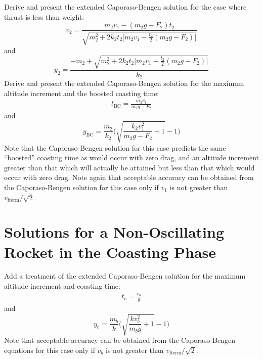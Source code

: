 Derive and present the extended Caporaso-Bengen solution for the case where thrust is less than weight:
\begin{equation*}
v_2 = \frac{m_2v_1 - (m_2g - F_2)t_2}{\sqrt{m_2^{2} + 2k_2t_2\bigl[m_2v_1 - \tfrac{t_2}{2}(m_2g - F_2)\bigr]}}
\end{equation*}
and
\begin{equation*}
y_2 = \frac{-m_2 + \sqrt{m_2^{2} + 2k_2t_2\bigl[m_2v_1 - \tfrac{t_2}{2}(m_2g - F_2)\bigr]}}{k_2}
\end{equation*}
Derive and present the extended Caporaso-Bengen solution for the maximum altitude increment and the boosted
coasting time:
\begin{gather*}
t_{\mathrm{BC}} = \frac{m_2v_1}{m_2g - F_2}
\end{gather*}
and
\begin{equation*}
y_{\mathrm{BC}} = \frac{m_2}{k_2}\biggl(\sqrt{\frac{k_2v_1^{2}}{m_2g - F_2} + 1} - 1\biggr)
\end{equation*}
Note that the Caporaso-Bengen solution for this case predicts the same ``boosted'' coasting time as would
occur with zero drag, and an altitude increment greater than that which will actually be attained but less
than that which would occur with zero drag. Note again that acceptable accuracy can be obtained from the
Caporaso-Bengen solution for this case only if $v_1$ is not greater than $v_{\mathrm{fterm}}/\sqrt{2}$.

\section*{Solutions for a Non-Oscillating Rocket in the Coasting Phase}\label{supp:ch4-summary:coasting}

Add a treatment of the extended Caporaso-Bengen solution for the maximum altitude increment and coasting
time:
\begin{gather*}
t_c = \frac{v_b}{g}
\end{gather*}
and
\begin{equation*}
y_c = \frac{m_b}{k}\biggl(\sqrt{\frac{kv_b^{2}}{m_bg} + 1} - 1\biggr)
\end{equation*}
Note that acceptable accuracy can be obtained from the Caporaso-Bengen equations for this case only if $v_b$
is not greater than $v_{\mathrm{fterm}}/\sqrt{2}$.
